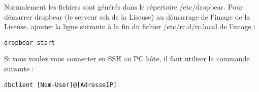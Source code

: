 Normalement les fichiers sont générés dans le répertoire /etc/dropbear.
Pour démarrer dropbear (le serveur ssh de la Liseuse) au démarrage de l'image de la Liseuse, ajouter la ligne suivante à la fin du fichier /etc/rc.d/rc.local de l'image :

\begin{lstlisting}
dropbear start
\end{lstlisting}

Si vous voulez vous connecter en SSH au PC hôte, il faut utiliser la commande suivante : 
\begin{lstlisting}
dbclient [Nom-User]@[AdresseIP]
\end{lstlisting}